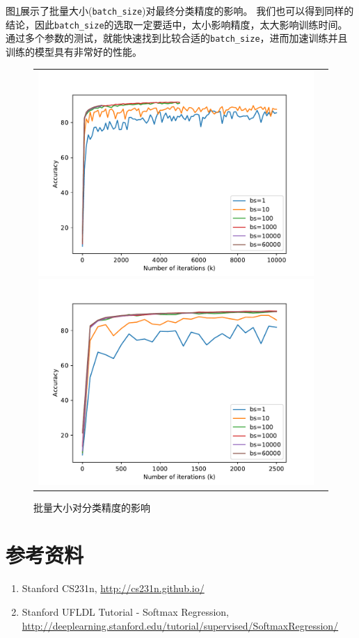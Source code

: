 \documentclass[logo,reportComp]{thesis}
\begin{document}
图\ref{fig:batch-size}展示了批量大小(\verb'batch_size')对最终分类精度的影响。
我们也可以得到同样的结论，因此\verb'batch_size'的选取一定要适中，太小影响精度，太大影响训练时间。
通过多个参数的测试，就能快速找到比较合适的\verb'batch_size'，进而加速训练并且训练的模型具有非常好的性能。
\begin{figure}[H]
\centering
\begin{tabular}{cc}
\includegraphics[width=0.5\linewidth]{fig/batch-size.pdf}
\includegraphics[width=0.5\linewidth]{fig/batch-size-2.pdf}
\end{tabular}
\caption{批量大小对分类精度的影响}
\label{fig:batch-size}
\end{figure}

\section{参考资料}
\begin{enumerate}
	\item Stanford CS231n, \url{http://cs231n.github.io/}
	\item Stanford UFLDL Tutorial - Softmax Regression, \url{http://deeplearning.stanford.edu/tutorial/supervised/SoftmaxRegression/}
\end{enumerate}
\end{document}
